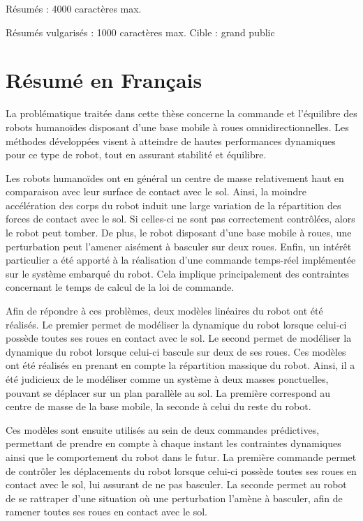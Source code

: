 \documentclass[10pt]{report}
\begin{document}
Résumés : 4000 caractères max.

Résumés vulgarisés : 1000 caractères max. Cible : grand public

\section{Résumé en Français}

  La problématique traitée dans cette thèse concerne la commande et l'équilibre des robots humanoïdes disposant d'une base mobile à roues omnidirectionnelles.
  Les méthodes développées visent à atteindre de hautes performances dynamiques pour ce type de robot, tout en assurant stabilité et équilibre.

  Les robots humanoïdes ont en général un centre de masse relativement haut en comparaison avec leur surface de contact avec le sol. 
  Ainsi, la moindre accélération des corps du robot induit une large variation de la répartition des forces de contact avec le sol.
  Si celles-ci ne sont pas correctement contrôlées, alors le robot peut tomber.
  De plus, le robot disposant d'une base mobile à roues, une perturbation peut l'amener aisément à basculer sur deux roues.
  Enfin, un intérêt particulier a été apporté à la réalisation d'une commande temps-réel implémentée sur le système embarqué du robot.
  Cela implique principalement des contraintes concernant le temps de calcul de la loi de commande.
  
  Afin de répondre à ces problèmes, deux modèles linéaires du robot ont été réalisés.
  Le premier permet de modéliser la dynamique du robot lorsque celui-ci possède toutes ses roues en contact avec le sol.
  Le second permet de modéliser la dynamique du robot lorsque celui-ci bascule sur deux de ses roues.
  Ces modèles ont été réalisés en prenant en compte la répartition massique du robot. 
  Ainsi, il a été judicieux de le modéliser comme un système à deux masses ponctuelles, pouvant se déplacer sur un plan parallèle au sol. 
  La première correspond au centre de masse de la base mobile, la seconde à celui du reste du robot.
  
  Ces modèles sont ensuite utilisés au sein de deux commandes prédictives, permettant de prendre en compte à chaque instant les contraintes dynamiques ainsi que le comportement du robot dans le futur.
  La première commande permet de contrôler les déplacements du robot lorsque celui-ci possède toutes ses roues en contact avec le sol, lui assurant de ne pas basculer.
  La seconde permet au robot de se rattraper d'une situation où une perturbation l'amène à basculer, afin de ramener toutes ses roues en contact avec le sol.
 
\end{document}

